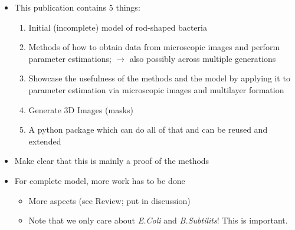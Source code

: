 \documentclass{article}
\begin{document}
\begin{itemize}
    \item This publication contains 5 things:
    \begin{enumerate}
        \item Initial (incomplete) model of rod-shaped bacteria
        \item Methods of how to obtain data from microscopic images and perform parameter
            estimations; $\rightarrow$ also possibly across multiple generations
        \item Showcase the usefulness of the methods and the model by applying it to parameter
            estimation via microscopic images and multilayer formation
        \item Generate 3D Images (masks)
        \item A python package which can do all of that and can be reused and extended
    \end{enumerate}
    \item Make clear that this is mainly a proof of the methods
    \item For complete model, more work has to be done
    \begin{itemize}
        \item More aspects (see Review; put in discussion)
        \item Note that we only care about \textit{E.Coli} and \textit{B.Subtilits}! This is
            important.
    \end{itemize}
\end{itemize}
\end{document}
